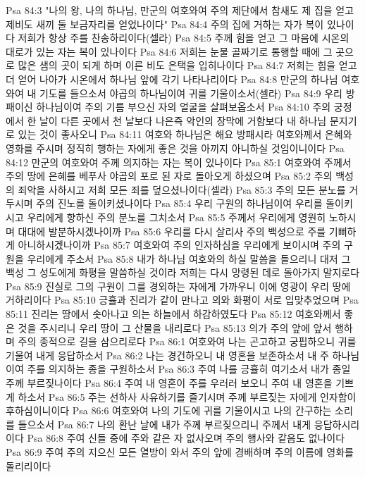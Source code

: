 Psa 84:3  "나의 왕, 나의 하나님, 만군의 여호와여 주의 제단에서 참새도 제 집을 얻고 제비도 새끼 둘 보금자리를 얻었나이다"
Psa 84:4  주의 집에 거하는 자가 복이 있나이다 저희가 항상 주를 찬송하리이다(셀라)
Psa 84:5  주께 힘을 얻고 그 마음에 시온의 대로가 있는 자는 복이 있나이다
Psa 84:6  저희는 눈물 골짜기로 통행할 때에 그 곳으로 많은 샘의 곳이 되게 하며 이른 비도 은택을 입히나이다
Psa 84:7  저희는 힘을 얻고 더 얻어 나아가 시온에서 하나님 앞에 각기 나타나리이다
Psa 84:8  만군의 하나님 여호와여 내 기도를 들으소서 야곱의 하나님이여 귀를 기울이소서(셀라)
Psa 84:9  우리 방패이신 하나님이여 주의 기름 부으신 자의 얼굴을 살펴보옵소서
Psa 84:10  주의 궁정에서 한 날이 다른 곳에서 천 날보다 나은즉 악인의 장막에 거함보다 내 하나님 문지기로 있는 것이 좋사오니
Psa 84:11  여호와 하나님은 해요 방패시라 여호와께서 은혜와 영화를 주시며 정직히 행하는 자에게 좋은 것을 아끼지 아니하실 것임이니이다
Psa 84:12  만군의 여호와여 주께 의지하는 자는 복이 있나이다
Psa 85:1  여호와여 주께서 주의 땅에 은혜를 베푸사 야곱의 포로 된 자로 돌아오게 하셨으며
Psa 85:2  주의 백성의 죄악을 사하시고 저희 모든 죄를 덮으셨나이다(셀라)
Psa 85:3  주의 모든 분노를 거두시며 주의 진노를 돌이키셨나이다
Psa 85:4  우리 구원의 하나님이여 우리를 돌이키시고 우리에게 향하신 주의 분노를 그치소서
Psa 85:5  주께서 우리에게 영원히 노하시며 대대에 발분하시겠나이까
Psa 85:6  우리를 다시 살리사 주의 백성으로 주를 기뻐하게 아니하시겠나이까
Psa 85:7  여호와여 주의 인자하심을 우리에게 보이시며 주의 구원을 우리에게 주소서
Psa 85:8  내가 하나님 여호와의 하실 말씀을 들으리니 대저 그 백성 그 성도에게 화평을 말씀하실 것이라 저희는 다시 망령된 데로 돌아가지 말지로다
Psa 85:9  진실로 그의 구원이 그를 경외하는 자에게 가까우니 이에 영광이 우리 땅에 거하리이다
Psa 85:10  긍휼과 진리가 같이 만나고 의와 화평이 서로 입맞추었으며
Psa 85:11  진리는 땅에서 솟아나고 의는 하늘에서 하감하였도다
Psa 85:12  여호와께서 좋은 것을 주시리니 우리 땅이 그 산물을 내리로다
Psa 85:13  의가 주의 앞에 앞서 행하며 주의 종적으로 길을 삼으리로다
Psa 86:1  여호와여 나는 곤고하고 궁핍하오니 귀를 기울여 내게 응답하소서
Psa 86:2  나는 경건하오니 내 영혼을 보존하소서 내 주 하나님이여 주를 의지하는 종을 구원하소서
Psa 86:3  주여 나를 긍휼히 여기소서 내가 종일 주께 부르짖나이다
Psa 86:4  주여 내 영혼이 주를 우러러 보오니 주여 내 영혼을 기쁘게 하소서
Psa 86:5  주는 선하사 사유하기를 즐기시며 주께 부르짖는 자에게 인자함이 후하심이니이다
Psa 86:6  여호와여 나의 기도에 귀를 기울이시고 나의 간구하는 소리를 들으소서
Psa 86:7  나의 환난 날에 내가 주께 부르짖으리니 주께서 내게 응답하시리이다
Psa 86:8  주여 신들 중에 주와 같은 자 없사오며 주의 행사와 같음도 없나이다
Psa 86:9  주여 주의 지으신 모든 열방이 와서 주의 앞에 경배하며 주의 이름에 영화를 돌리리이다
